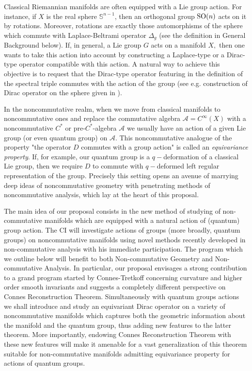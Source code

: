 \documentclass{article}
\begin{document}
Classical Riemannian manifolds are often equipped with a Lie group action. For instance, if $X$ is the real sphere $\mathbb{S}^{n-1}$, then an orthogonal group ${\rm SO}(n)$ acts on it by rotations. Moreover, rotations are exactly those automorphisms of the sphere which commute with Laplace-Beltrami operator $\Delta_g$ (see the definition in General Background below). If, in general, a Lie group $G$ acts on a manifold $X,$ then one wants to take this action into account by constructing a Laplace-type or a Dirac-type operator compatible with this action. A natural way to achieve this objective is to request that the Dirac-type operator featuring in the definition of the spectral triple commutes with the action of the group (see e.g. construction of Dirac operator on the sphere given in \cite{GVF}). 

In the noncommutative realm, when we move from classical manifolds to noncommutative ones and replace the commutative algebra $\mathcal{A}=C^{\infty}(X)$ with a noncommutative $C^*$ or pre-$C^*$-algebra $\mathcal{A}$ we usually have an action of a given Lie group (or even quantum group) on $\mathcal{A}.$ This noncommutative analogue of the property "the operator $D$ commutes with a group action" is called an {\it equivariance property}. If, for example, our quantum group is a $q-$deformation of a classical Lie group, then we require $D$ to commute with $q-$deformed left regular representation of the group. Precisely this setting opens an avenue of marrying deep ideas of noncommutative geometry with penetrating methods of noncommutative analysis, which lay at the heart of this proposal.


The main idea of our proposal consists in the new method of studying of non-commutative manifolds which are equipped with a natural action of (quantum) group action. The CI will investigate actions of groups (more broadly, quantum groups) on noncommutative manifolds using novel methods recently developed in non-commutative analysis with his immediate participation. The program which we outline below will benefit to both Non-commutative Geometry and Non-commutative Analysis. In particular,  our proposal envisages a strong contribution to a grand program started by Connes-Tretkoff \cite{ConnesTretkoff} concerning curvature and higher order smooth invariants and suggests a completely different perspective on Connes Reconstruction Theorem. Simultaneously with quantum groups actions we shall introduce and study an equivariant Dirac operator on a variety of noncommutative manifolds which captures both the geometric information about the manifold and the quantum group, thus adding new features to the latter theorem. More importantly, endowing Connes Reconstruction Theorem with these new features will make it amenable for a vast generalization of this theorem suitable for non-commutative manifolds admitting equivariance property for actions of quantum groups.
\end{document}
